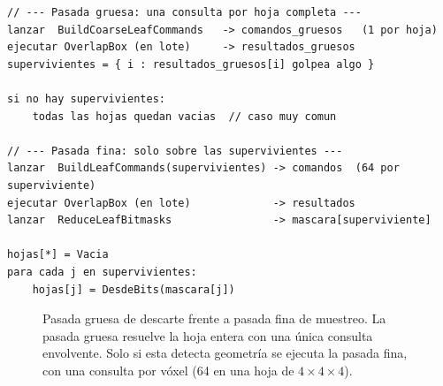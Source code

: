 \begin{lstlisting}
// --- Pasada gruesa: una consulta por hoja completa ---
lanzar  BuildCoarseLeafCommands   -> comandos_gruesos   (1 por hoja)
ejecutar OverlapBox (en lote)     -> resultados_gruesos
supervivientes = { i : resultados_gruesos[i] golpea algo }

si no hay supervivientes:
    todas las hojas quedan vacias  // caso muy comun

// --- Pasada fina: solo sobre las supervivientes ---
lanzar  BuildLeafCommands(supervivientes) -> comandos  (64 por superviviente)
ejecutar OverlapBox (en lote)             -> resultados
lanzar  ReduceLeafBitmasks                -> mascara[superviviente]

hojas[*] = Vacia
para cada j en supervivientes:
    hojas[j] = DesdeBits(mascara[j])
\end{lstlisting}

\begin{figure}[htp]
  \centering
  \caption[Pasada gruesa de descarte frente a pasada fina de muestreo.]
  {Pasada gruesa de descarte frente a pasada fina de muestreo.
  La pasada gruesa resuelve la hoja entera con una única consulta envolvente. Solo si esta detecta geometría se ejecuta la pasada fina, con una consulta por vóxel (64 en una hoja de $4\times4\times4$).}
  \label{fig:empty-leaf}
\end{figure}

